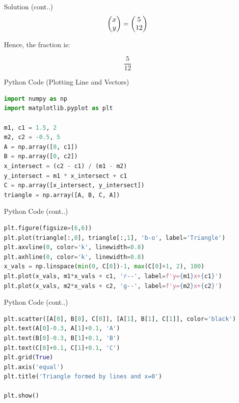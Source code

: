 \documentclass{beamer}
\begin{document}
\begin{frame}{Solution (cont..)}
\begin{align}
\begin{pmatrix}x \\ y\end{pmatrix} = \begin{pmatrix}5 \\ 12\end{pmatrix}
\end{align}

Hence, the fraction is:

\[
\boxed{\frac{5}{12}}
\]
\end{frame}

\begin{frame}[fragile]{Python Code (Plotting Line and Vectors)}
\begin{lstlisting}[language=Python]
import numpy as np
import matplotlib.pyplot as plt

m1, c1 = 1.5, 2 
m2, c2 = -0.5, 5     
A = np.array([0, c1])
B = np.array([0, c2])
x_intersect = (c2 - c1) / (m1 - m2)
y_intersect = m1 * x_intersect + c1
C = np.array([x_intersect, y_intersect])
triangle = np.array([A, B, C, A]) 
\end{lstlisting}
\end{frame}

\begin{frame}[fragile]{Python Code (cont..)}
\begin{lstlisting}[language=Python]
plt.figure(figsize=(6,6))
plt.plot(triangle[:,0], triangle[:,1], 'b-o', label='Triangle')
plt.axvline(0, color='k', linewidth=0.8) 
plt.axhline(0, color='k', linewidth=0.8) 
x_vals = np.linspace(min(0, C[0])-1, max(C[0]+1, 2), 100)
plt.plot(x_vals, m1*x_vals + c1, 'r--', label=f'y={m1}x+{c1}')
plt.plot(x_vals, m2*x_vals + c2, 'g--', label=f'y={m2}x+{c2}')
\end{lstlisting}
\end{frame}

\begin{frame}[fragile]{Python Code (cont..)}
\begin{lstlisting}[language=Python]
plt.scatter([A[0], B[0], C[0]], [A[1], B[1], C[1]], color='black')
plt.text(A[0]-0.3, A[1]+0.1, 'A')
plt.text(B[0]-0.3, B[1]+0.1, 'B')
plt.text(C[0]+0.1, C[1]+0.1, 'C')
plt.grid(True)
plt.axis('equal')
plt.title('Triangle formed by lines and x=0')

plt.show()
\end{lstlisting}
\end{frame}
\end{document}
